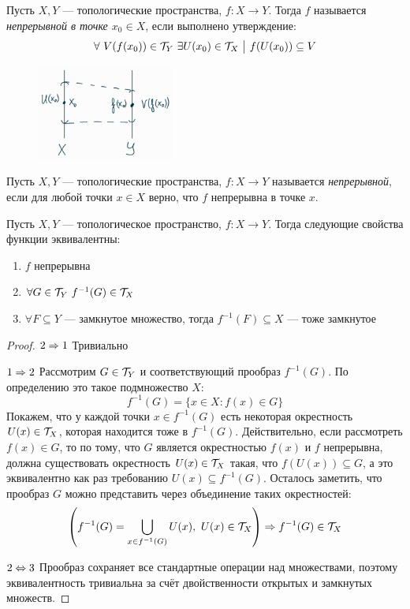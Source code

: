 \begin{definition}
	Пусть $X, Y$ --- топологические пространства, $f \colon X \to Y$. Тогда $f$ называется \textit{непрерывной в точке $x_0 \in X$}, если выполнено утверждение:
	\[
		\forall\ V(f(x_0)) \in \Tau_Y\ \exists U(x_0) \in \Tau_X \such f(U(x_0)) \subseteq V
	\]
\end{definition}

\begin{figure}[h]
	\centering
	\includegraphics[width=0.4\textwidth]{images/1pic.png}
\end{figure}

\begin{definition}
	Пусть $X, Y$ --- топологические пространства, $f \colon X \to Y$ называется \textit{непрерывной}, если для любой точки $x \in X$ верно, что $f$ непрерывна в точке $x$.
\end{definition}

\begin{theorem}
	Пусть $X, Y$ --- топологическое пространство, $f \colon X \to Y$. Тогда следующие свойства функции эквивалентны:
	\begin{enumerate}
		\item $f$ непрерывна
		
		\item $\forall G \in \mathcal{T}_Y\ f^{-1}(G) \in \mathcal{T}_X$
		
		\item $\forall F \subseteq Y$ --- замкнутое множество, тогда $f^{-1}(F) \subseteq X$ --- тоже замкнутое
	\end{enumerate}
\end{theorem}

\begin{proof}
	\item $2 \Rightarrow 1$ Тривиально
	
	\item $1 \Rightarrow 2$ Рассмотрим $G \in \mathcal{T}_Y$ и соответствующий прообраз $f^{-1}(G)$. По определению это такое подмножество $X$:
	\[
		f^{-1}(G) = \{x \in X \colon f(x) \in G\}
	\]
	Покажем, что у каждой точки $x \in f^{-1}(G)$ есть некоторая окрестность $U(x) \in \mathcal{T}_X$, которая находится тоже в $f^{-1}(G)$. Действительно, если рассмотреть $f(x) \in G$, то по тому, что $G$ является окрестностью $f(x)$ и $f$ непрерывна, должна существовать окрестность $U(x) \in \mathcal{T}_X$ такая, что $f(U(x)) \subseteq G$, а это эквивалентно как раз требованию $U(x) \subseteq f^{-1}(G)$. Осталось заметить, что прообраз $G$ можно представить через объединение таких окрестностей:
	\[
		\ps{f^{-1}(G) = \bigcup_{x \in f^{-1}(G)} U(x),\ U(x) \in \Tau_X} \Ra f^{-1}(G) \in \Tau_X
	\]
	
	\item $2 \Leftrightarrow 3$ Прообраз сохраняет все стандартные операции над множествами, поэтому эквивалентность тривиальна за счёт двойственности открытых и замкнутых множеств.
\end{proof}